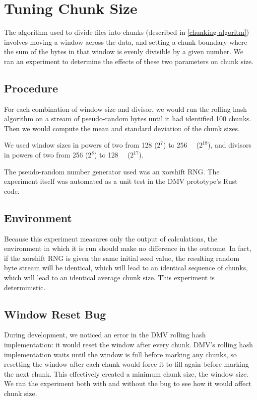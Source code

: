 \section{Tuning Chunk Size}\label{rolling-hash-exp}

The algorithm used to divide files into chunks (described in
\autoref{chunking-algoritm}) involves moving a window across the data, and
setting a chunk boundary where the sum of the bytes in that window is evenly
divisible by a given number. We ran an experiment to determine the effects of
these two parameters on chunk size.

\subsection{Procedure}

For each combination of window size and divisor, we would run the rolling hash
algorithm on a stream of pseudo-random bytes until it had identified \num{100}
chunks. Then we would compute the mean and standard deviation of the chunk
sizes.

We used window sizes in powers of two from \SI{128}{\byte} ($2^7$) to
\SI{256}{\kibi\byte} ($2^{18}$), and divisors in powers of two from \num{256}
($2^8$) to \SI{128}{\kibi\relax} ($2^{17}$).

The pseudo-random number generator used was an xorshift RNG\cite{xorshift_rng}.
The experiment itself was automated as a unit test in the \gls{DMV} prototype's
Rust code.

\subsection{Environment}

Because this experiment measures only the output of calculations, the
environment in which it is run should make no difference in the outcome. In
fact, if the xorshift RNG is given the same initial seed value, the resulting
random byte stream will be identical, which will lead to an identical sequence
of chunks, which will lead to an identical average chunk size. This experiment
is deterministic.

\subsection{Window Reset Bug}

During development, we noticed an error in the DMV rolling hash implementation:
it would reset the window after every chunk. DMV's rolling hash implementation
waits until the window is full before marking any chunks, so resetting the
window after each chunk would force it to fill again before marking the next
chunk. This effectively created a minimum chunk size, the window size. We ran
the experiment both with and without the bug to see how it would affect chunk
size.

